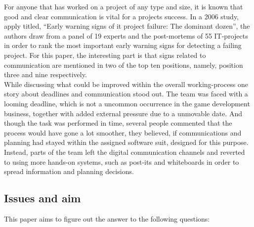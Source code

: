 
For anyone that has worked on a project of any type and size, it is known that
good and clear communication is vital for a projects success. In a 2006 study, apply
titled, \enquote{Early warning signs of it project failure: The dominant
dozen}\cite{c_warning_signs_project_article}, the authors draw from a panel of
19 experts and the post-mortems of 55 IT-projects in order to rank the most
important early warning signs for detecting a failing project. For this
paper, the interesting part is that signs related to communication are mentioned
in two of the top ten positions, namely, position three and nine respectively.
\\

While discussing what could be improved within the overall working-process one
story about deadlines and communication stood out. The team was faced with a
looming deadline, which is not a uncommon occurrence in the game development
business, together with added external pressure due to a unmovable date. And
though the task was performed in time, several people commented that the
process would have gone a lot smoother, they believed, if communications and
planning had stayed within the assigned software suit, designed for this
purpose. Instead, parts of the team left the digital communication channels and
reverted to using more hands-on systems, such as post-its and whiteboards in
order to spread information and planning decisions.





\subsection{Issues and aim}


  This paper aims to figure out the answer to the following questions:

